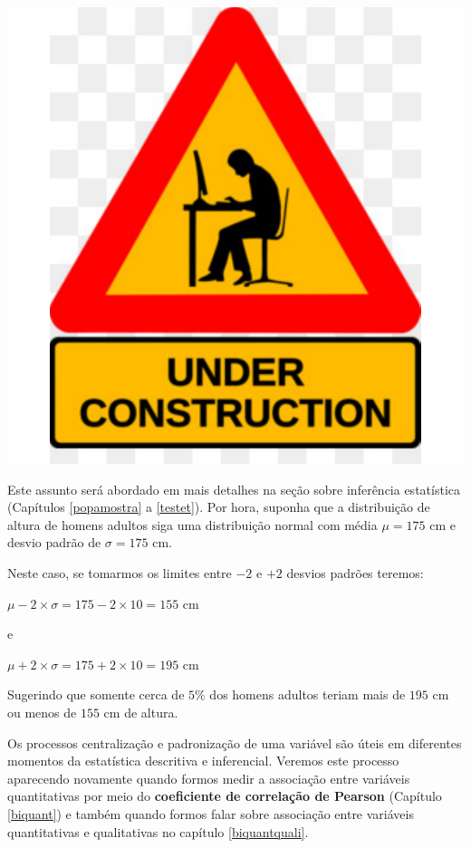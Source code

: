 \documentclass[
]{book}
\begin{document}
\begin{center}\includegraphics{probest-cambientais_files/figure-latex/unnamed-chunk-168-1} \end{center}

Este assunto será abordado em mais detalhes na seção sobre inferência estatística (Capítulos \ref{popamostra} a \ref{testet}). Por hora, suponha que a distribuição de altura de homens adultos siga uma distribuição normal com média \(\mu = 175\) cm e desvio padrão de \(\sigma = 175\) cm.

Neste caso, se tomarmos os limites entre \(-2\) e \(+2\) desvios padrões teremos:

\(\mu - 2 \times \sigma = 175 - 2 \times 10 = 155\) cm

e

\(\mu + 2 \times \sigma = 175 + 2 \times 10 = 195\) cm

Sugerindo que somente cerca de \(5\%\) dos homens adultos teriam mais de \(195\) cm ou menos de \(155\) cm de altura.

Os processos centralização e padronização de uma variável são úteis em diferentes momentos da estatística descritiva e inferencial. Veremos este processo aparecendo novamente quando formos medir a associação entre variáveis quantitativas por meio do \textbf{coeficiente de correlação de Pearson} (Capítulo \ref{biquant}) e também quando formos falar sobre associação entre variáveis quantitativas e qualitativas no capítulo \ref{biquantquali}.
\end{document}
